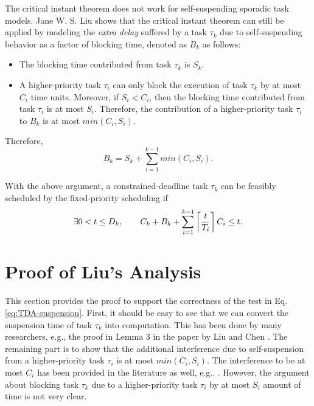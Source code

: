The critical instant theorem does not work for self-suspending sporadic task models.  
Jane W. S. Liu \cite{Liu:2000:RS:518501} shows that the critical instant theorem can still be applied by modeling the \emph{extra delay} suffered by a task $\tau_k$ due to self-suspending behavior as a factor of blocking time, denoted as $B_k$ as follows:
\begin{itemize}
\item The blocking time contributed from task $\tau_k$ is $S_k$.
\item A higher-priority task $\tau_i$ can only block the execution of task $\tau_k$ by at most $C_i$ time units. Moreover, if $S_i < C_i$, then the blocking time contributed from task $\tau_i$ is at most $S_i$. Therefore, the contribution of a higher-priority task $\tau_i$  to $B_k$ is at most $min(C_i, S_i)$.
\end{itemize}
Therefore, 
\begin{equation}
\label{eq:Bk}
B_k = S_k + \sum_{i=1}^{k-1} min(C_i, S_i).
\end{equation}

With the above argument, a constrained-deadline task $\tau_k$ can be feasibly scheduled by the fixed-priority scheduling if
\begin{equation}
\label{eq:TDA-suspension}
\exists 0 < t \leq D_k, \qquad C_k + B_k + \sum_{i=1}^{k-1}\left\lceil{\frac{t}{T_i}}\right\rceil C_i \leq t.
\end{equation}
  
  
\section{Proof of Liu's Analysis}  

This section provides the proof to support the correctness of the test in Eq. \eqref{eq:TDA-suspension}. First, it should be easy to see that we can convert the suspension time of task $\tau_k$ into computation. This has been done by many researchers, e.g., the proof in Lemma 3 in the paper by Liu and Chen \cite{Liu_2014}. The remaining part is to show that the additional interference due to self-suspension from a higher-priority task $\tau_i$ is at most $min(C_i, S_i)$. The interference to be at most $C_i$ has been provided in the literature as well, e.g., \cite{Rajkumar_1990}\cite{Liu_2014}. However, the argument about blocking task $\tau_k$ due to a higher-priority task $\tau_i$ by at most $S_i$ amount of time is not very clear. 

  
  
  
  
  
  
  
  
  
  
  
  
  
  